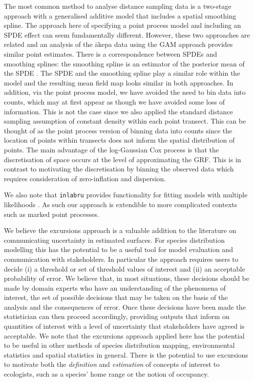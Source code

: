 \documentclass[preprint,12pt]{elsarticle}
\newcommand{\akepa}{\textquotesingle\={a}kepa}  %
\begin{document}
The most common method to analyse distance sampling data is a two-stage approach with a generalised additive model that includes a spatial smoothing spline.  The approach here of specifying a point process model and including an SPDE effect can seem fundamentally different.  However, these two approaches are related and an analysis of the \akepa{} data using the GAM approach provides similar point estimates.  There is a correspondence between SPDEs and smoothing splines: the smoothing spline is an estimator of the posterior mean of the SPDE \citep{kimeldorf_spline_2002}.  The SPDE and the smoothing spline play a similar role within the model and the resulting mean field map looks similar in both approaches.  
In addition, via the point process model, we have avoided the need to bin data into counts, which may at first appear as though we have avoided some loss of information. This is not the case since we also applied the standard distance sampling assumption of constant density within each point transect.  This can be thought of as the point process version of binning data into counts since the location of points within transects does not inform the spatial distribution of points.  The main advantage of the log-Gaussian Cox process is that the discretisation of space occurs at the level of approximating the GRF.  This is in contrast to motivating the discretisation by binning the observed data which requires consideration of zero-inflation and dispersion.  

We also note that \texttt{inlabru} provides functionality for fitting models with multiple likelihoods \citep{bachl_inlabru_2019}.  As such our approach is extendible to more complicated contexts such as marked point processes.    

We believe the excursions approach is a valuable addition to the literature on communicating uncertainty in estimated surfaces.  For species distribution modelling this has the potential to be a useful tool for model evaluation and communication with stakeholders.  In particular the approach requires users to decide (i) a threshold or set of threshold values of interest and (ii) an acceptable probability of error. 
We believe that, in most situations, these decisions should be made by domain experts who have an understanding of the phenomena of interest, the set of possible decisions that may be taken on the basis of the analysis and the consequences of error.  Once these decisions have been made the statistician can then proceed accordingly, providing outputs  that inform on quantities of interest with a level of uncertainty that stakeholders have agreed is acceptable.  We note that the excursions approach applied here has the potential to be useful in other methods of species distribution mapping, environmental statistics and spatial statistics in general.  There is the potential to use excursions to motivate both the \textit{definition} and \textit{estimation} of concepts of interest to ecologists, such as a species' home range or the notion of occupancy. 
\end{document}
